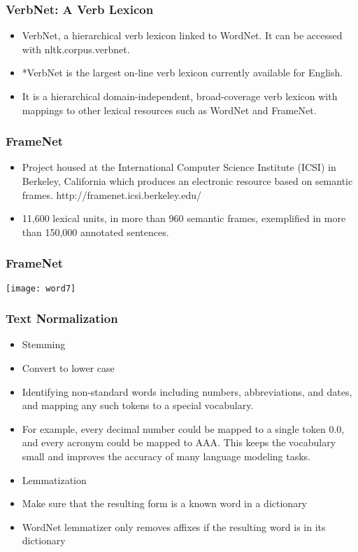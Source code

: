 \begin{frame}[fragile]
\frametitle{VerbNet: A Verb Lexicon}
\begin{itemize}
\item VerbNet, a hierarchical verb lexicon linked to WordNet. It can be accessed with nltk.corpus.verbnet. 
\item *VerbNet is the largest on-line verb lexicon currently available for English. 
\item It is a hierarchical domain-independent, broad-coverage verb lexicon with mappings to other lexical resources such as WordNet and FrameNet.
\end{itemize}
\end{frame}


\begin{frame}[fragile]
\frametitle{FrameNet}
\begin{itemize}
\item Project housed at the International Computer Science Institute (ICSI) in Berkeley, California which produces an electronic resource based on semantic frames. 	http://framenet.icsi.berkeley.edu/
\item 11,600 lexical units, in more than 960 semantic frames, exemplified in more than 150,000 annotated sentences. 
\end{itemize}
\end{frame}

\begin{frame}[fragile]
\frametitle{FrameNet}
\begin{center}
\texttt{[image: word7]}
\end{center}
\end{frame}

\begin{frame}[fragile]
\frametitle{ Text Normalization }
\begin{itemize}
\item Stemming
\item Convert to lower case
\item Identifying non-standard words including numbers, abbreviations, and dates, and mapping any such tokens to a special vocabulary. 
\item For example, every decimal number could be mapped to a single token 0.0, and every acronym could be mapped to AAA. This keeps the vocabulary small and improves the accuracy of many language modeling tasks. 
\item Lemmatization
\item Make sure that the resulting form is a known word in a dictionary 
\item WordNet lemmatizer only removes affixes if the resulting word is in its dictionary 
\end{itemize}
\end{frame}

